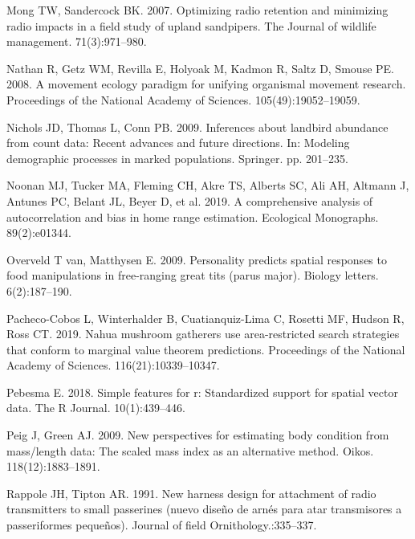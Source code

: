 \documentclass[
]{article}
\begin{document}
\leavevmode\hypertarget{ref-mong2007optimizing}{}%
Mong TW, Sandercock BK. 2007. Optimizing radio retention and minimizing
radio impacts in a field study of upland sandpipers. The Journal of
wildlife management. 71(3):971--980.

\leavevmode\hypertarget{ref-nathan2008movement}{}%
Nathan R, Getz WM, Revilla E, Holyoak M, Kadmon R, Saltz D, Smouse PE.
2008. A movement ecology paradigm for unifying organismal movement
research. Proceedings of the National Academy of Sciences.
105(49):19052--19059.

\leavevmode\hypertarget{ref-nichols2009inferences}{}%
Nichols JD, Thomas L, Conn PB. 2009. Inferences about landbird abundance
from count data: Recent advances and future directions. In: Modeling
demographic processes in marked populations. Springer. pp. 201--235.

\leavevmode\hypertarget{ref-noonan2019comprehensive}{}%
Noonan MJ, Tucker MA, Fleming CH, Akre TS, Alberts SC, Ali AH, Altmann
J, Antunes PC, Belant JL, Beyer D, et al. 2019. A comprehensive analysis
of autocorrelation and bias in home range estimation. Ecological
Monographs. 89(2):e01344.

\leavevmode\hypertarget{ref-van2009personality}{}%
Overveld T van, Matthysen E. 2009. Personality predicts spatial
responses to food manipulations in free-ranging great tits (parus
major). Biology letters. 6(2):187--190.

\leavevmode\hypertarget{ref-pacheco2019nahua}{}%
Pacheco-Cobos L, Winterhalder B, Cuatianquiz-Lima C, Rosetti MF, Hudson
R, Ross CT. 2019. Nahua mushroom gatherers use area-restricted search
strategies that conform to marginal value theorem predictions.
Proceedings of the National Academy of Sciences. 116(21):10339--10347.

\leavevmode\hypertarget{ref-pebesma2018simple}{}%
Pebesma E. 2018. Simple features for r: Standardized support for spatial
vector data. The R Journal. 10(1):439--446.

\leavevmode\hypertarget{ref-peig2009new}{}%
Peig J, Green AJ. 2009. New perspectives for estimating body condition
from mass/length data: The scaled mass index as an alternative method.
Oikos. 118(12):1883--1891.

\leavevmode\hypertarget{ref-rappole1991new}{}%
Rappole JH, Tipton AR. 1991. New harness design for attachment of radio
transmitters to small passerines (nuevo diseño de arnés para atar
transmisores a passeriformes pequeños). Journal of field
Ornithology.:335--337.
\end{document}
